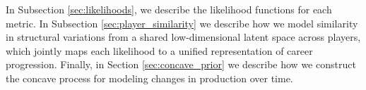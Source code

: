 \documentclass[aoas]{imsart}
\begin{document}
In Subsection \ref{sec:likelihoods}, we describe the likelihood functions for each metric. In Subsection \ref{sec:player_similarity} we describe how we model similarity in structural variations from a shared low-dimensional latent space across players, which jointly maps each likelihood to a unified representation of career progression. Finally, 
in Section \ref{sec:concave_prior} we describe how we construct the concave process for modeling changes in production over time.  








\end{document}

